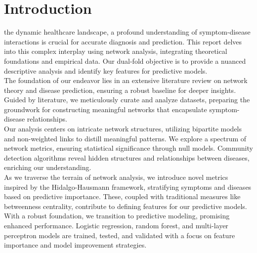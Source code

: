 \section{Introduction}

 the dynamic healthcare landscape, a profound understanding of symptom-disease interactions is crucial for accurate diagnosis and prediction.
This report delves into this complex interplay using network analysis, integrating theoretical foundations and empirical data.
Our dual-fold objective is to provide a nuanced descriptive analysis and identify key features for predictive models.\\
The foundation of our endeavor lies in an extensive literature review on network theory and disease prediction,
ensuring a robust baseline for deeper insights. Guided by literature, we meticulously curate and analyze datasets,
preparing the groundwork for constructing meaningful networks that encapsulate symptom-disease relationships.\\
Our analysis centers on intricate network structures, utilizing bipartite models and non-weighted links to distill meaningful patterns.
We explore a spectrum of network metrics, ensuring statistical significance through null models.
Community detection algorithms reveal hidden structures and relationships between diseases, enriching our understanding.\\
As we traverse the terrain of network analysis, we introduce novel metrics inspired by the Hidalgo-Hausmann framework,
stratifying symptoms and diseases based on predictive importance. These, coupled with traditional measures like betweenness centrality,
contribute to defining features for our predictive models.\\
With a robust foundation, we transition to predictive modeling, promising enhanced performance.
Logistic regression, random forest, and multi-layer perceptron models are trained, tested,
and validated with a focus on feature importance and model improvement strategies.


